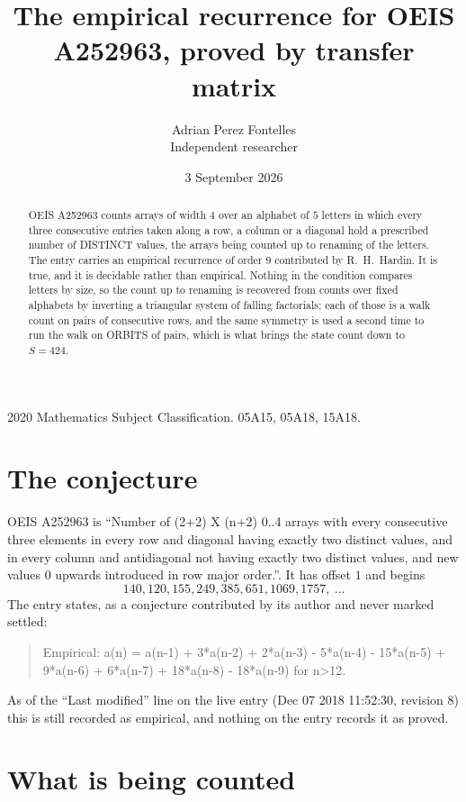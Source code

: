 \documentclass[11pt,a4paper]{article}
\title{The empirical recurrence for OEIS A252963, proved by transfer matrix}
\author{Adrian Perez Fontelles\\ \small Independent researcher}
\date{3 September 2026}
\theoremstyle{plain}
\theoremstyle{definition}
\begin{document}
\maketitle

\begin{abstract}
OEIS A252963 counts arrays of width $4$ over an alphabet of $5$ letters in which every three
consecutive entries taken along a row, a column or a diagonal hold a prescribed number of
DISTINCT values, the arrays being counted up to renaming of the letters. The entry carries an
empirical recurrence of order $9$ contributed by R.~H.~Hardin. It is true, and it is
decidable rather than empirical. Nothing in the condition compares letters by size, so the
count up to renaming is recovered from counts over fixed alphabets by inverting a triangular
system of falling factorials; each of those is a walk count on pairs of consecutive rows, and
the same symmetry is used a second time to run the walk on ORBITS of pairs, which is what
brings the state count down to $S=424$.
\end{abstract}

\noindent\small 2020 Mathematics Subject Classification. 05A15, 05A18, 15A18.\normalsize

\section{The conjecture}

OEIS A252963 is ``Number of (2+2) X (n+2) 0..4 arrays with every consecutive three elements in every row and diagonal having exactly two distinct values, and in every column and antidiagonal not having exactly two distinct values, and new values 0 upwards introduced in row major order.''. It has offset $1$ and begins
\[
140, 120, 155, 249, 385, 651, 1069, 1757,\ \dots
\]
The entry states, as a conjecture contributed by its author and never marked settled:
\begin{quote}
Empirical: a(n) = a(n-1) + 3*a(n-2) + 2*a(n-3) - 5*a(n-4) - 15*a(n-5) + 9*a(n-6) + 6*a(n-7) + 18*a(n-8) - 18*a(n-9) for n>12.
\end{quote}
As of the ``Last modified'' line on the live entry (Dec 07 2018 11:52:30, revision 8) this is still
recorded as empirical, and nothing on the entry records it as proved.

\section{What is being counted}
\end{document}
